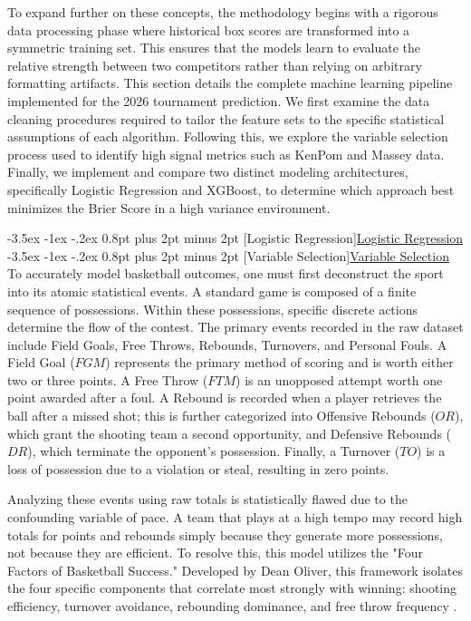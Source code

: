 \documentclass[12pt,leqno]{article}\usepackage[pdftex]{graphicx}\usepackage[usenames,dvipsnames]{xcolor}
\makeatletter
\renewcommand\subsection{\@startsection {subsection}{1}{\z@}%
{-3.5ex \@plus -1ex \@minus -.2ex}%
{0.8pt plus 2pt minus 2pt}%
{\normalfont}}
\renewcommand\subsubsection{\@startsection {subsubsection}{1}{\z@}%
{-3.5ex \@plus -1ex \@minus -.2ex}%
{0.8pt plus 2pt minus 2pt}%
{\normalfont}}
\newcommand{\usubsection}[1]{\subsection[#1]{\centering\normalfont\underline{#1}}}%
\newcommand{\usubsubsection}[1]{\subsubsection[#1]{\normalfont\normalfont\underline{#1}}}%
\theoremstyle{remark}
\makeatother
\begin{document}
To expand further on these concepts, the methodology begins with a rigorous data processing phase where historical box scores are transformed into a symmetric training set.  This ensures that the models learn to evaluate the relative strength between two competitors rather than relying on arbitrary formatting artifacts. This section details the complete machine learning pipeline implemented for the 2026 tournament prediction. We first examine the data cleaning procedures required to tailor the feature sets to the specific statistical assumptions of each algorithm. Following this, we explore the variable selection process used to identify high signal metrics such as KenPom and Massey data. Finally, we implement and compare two distinct modeling architectures, specifically Logistic Regression and XGBoost, to determine which approach best minimizes the Brier Score in a high variance environment.

\usubsection{Logistic Regression}
\usubsubsection{Variable Selection}
To accurately model basketball outcomes, one must first deconstruct the sport into its atomic statistical events. A standard game is composed of a finite sequence of possessions. Within these possessions, specific discrete actions determine the flow of the contest. The primary events recorded in the raw dataset include Field Goals, Free Throws, Rebounds, Turnovers, and Personal Fouls. A Field Goal ($FGM$) represents the primary method of scoring and is worth either two or three points. A Free Throw ($FTM$) is an unopposed attempt worth one point awarded after a foul. A Rebound is recorded when a player retrieves the ball after a missed shot; this is further categorized into Offensive Rebounds ($OR$), which grant the shooting team a second opportunity, and Defensive Rebounds ($DR$), which terminate the opponent's possession. Finally, a Turnover ($TO$) is a loss of possession due to a violation or steal, resulting in zero points.

Analyzing these events using raw totals is statistically flawed due to the confounding variable of pace. A team that plays at a high tempo may record high totals for points and rebounds simply because they generate more possessions, not because they are efficient. To resolve this, this model utilizes the "Four Factors of Basketball Success." Developed by Dean Oliver, this framework isolates the four specific components that correlate most strongly with winning: shooting efficiency, turnover avoidance, rebounding dominance, and free throw frequency \cite{Dean}. 
\end{document}
